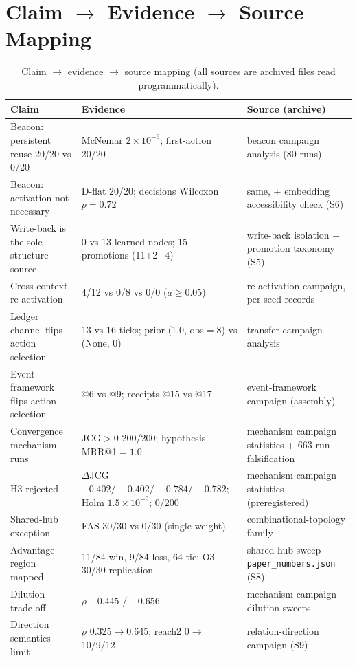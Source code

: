 \documentclass[10pt,a4paper]{article}
\begin{document}
\section{Claim $\rightarrow$ Evidence $\rightarrow$ Source Mapping}
\label{s14:claims}

\begin{table}[h]
\centering\small
\caption{Claim $\rightarrow$ evidence $\rightarrow$ source mapping (all sources are archived files read programmatically).}
\label{tab:s-claims}
\begin{tabular}{L{4.6cm}L{4.6cm}L{5.6cm}}
\toprule
\textbf{Claim} & \textbf{Evidence} & \textbf{Source (archive)} \\
\midrule
Beacon: persistent reuse 20/20 vs 0/20 & McNemar $2\times10^{-6}$; first-action 20/20 & beacon campaign analysis (80 runs) \\
Beacon: activation not necessary & D-flat 20/20; decisions Wilcoxon $p{=}0.72$ & same, + embedding accessibility check (S6) \\
Write-back is the sole structure source & 0 vs 13 learned nodes; 15 promotions (11+2+4) & write-back isolation + promotion taxonomy (S5) \\
Cross-context re-activation & 4/12 vs 0/8 vs 0/0 ($a\ge0.05$) & re-activation campaign, per-seed records \\
Ledger channel flips action selection & 13 vs 16 ticks; prior (1.0, obs$=$8) vs (None, 0) & transfer campaign analysis \\
Event framework flips action selection & @6 vs @9; receipts @15 vs @17 & event-framework campaign (assembly) \\
Convergence mechanism runs & JCG$>0$ 200/200; hypothesis MRR@1$=1.0$ & mechanism campaign statistics + 663-run falsification \\
H3 rejected & $\Delta$JCG $-0.402/-0.402/-0.784/-0.782$; Holm $1.5\times10^{-9}$; 0/200 & mechanism campaign statistics (preregistered) \\
Shared-hub exception & FAS 30/30 vs 0/30 (single weight) & combinational-topology family \\
Advantage region mapped & 11/84 win, 9/84 loss, 64 tie; O3 30/30 replication & shared-hub sweep \texttt{paper\_numbers.json} (S8) \\
Dilution trade-off & $\rho$ $-0.445$ / $-0.656$ & mechanism campaign dilution sweeps \\
Direction semantics limit & $\rho$ 0.325$\rightarrow$0.645; reach2 0$\rightarrow$10/9/12 & relation-direction campaign (S9) \\

\end{tabular}
\end{table}
\end{document}

